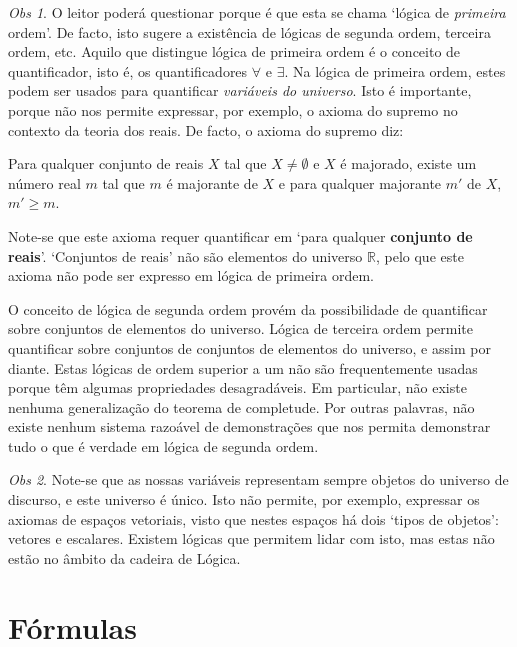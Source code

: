 \documentclass{report}
\theoremstyle{definition}
\theoremstyle{remark}
\newtheorem{obs}{Obs}
\newcommand{\R}{\mathbb{R}}
\begin{document}
	\begin{obs}
	O leitor poderá questionar porque é que esta se chama `lógica de \emph{primeira} ordem'. De facto, isto sugere a existência de lógicas de segunda ordem, terceira ordem, etc. Aquilo que distingue lógica de primeira ordem é o conceito de quantificador, isto é, os quantificadores $\forall$ e $\exists$. Na lógica de primeira ordem, estes podem ser usados para quantificar \emph{variáveis do universo}. Isto é importante, porque não nos permite expressar, por exemplo, o axioma do supremo no contexto da teoria dos reais. De facto, o axioma do supremo diz:
	
	\begin{center}
	Para qualquer conjunto de reais $X$ tal que $X \neq \emptyset$ e $X$ é majorado, existe um número real $m$ tal que $m$ é majorante de $X$ e para qualquer majorante $m'$ de $X$, $m' \geq m$.
	\end{center}
	
	Note-se que este axioma requer quantificar em `para qualquer \textbf{conjunto de reais}'. `Conjuntos de reais' não são elementos do universo $\R$, pelo que este axioma não pode ser expresso em lógica de primeira ordem.
	
	O conceito de lógica de segunda ordem provém da possibilidade de quantificar sobre conjuntos de elementos do universo. Lógica de terceira ordem permite quantificar sobre conjuntos de conjuntos de elementos do universo, e assim por diante. Estas lógicas de ordem superior a um não são frequentemente usadas porque têm algumas propriedades desagradáveis. Em particular, não existe nenhuma generalização do teorema de completude. Por outras palavras, não existe nenhum sistema razoável de demonstrações que nos permita demonstrar tudo o que é verdade em lógica de segunda ordem.
	\end{obs}
	
	\begin{obs}
	Note-se que as nossas variáveis representam sempre objetos do universo de discurso, e este universo é único. Isto não permite, por exemplo, expressar os axiomas de espaços vetoriais, visto que nestes espaços há dois `tipos de objetos': vetores e escalares. Existem lógicas que permitem lidar com isto, mas estas não estão no âmbito da cadeira de Lógica.
	\end{obs}
	
	\section{Fórmulas}
	
\end{document}
